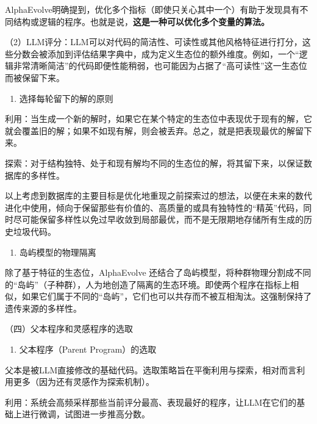 AlphaEvolve明确提到，优化多个指标（即使只关心其中一个）有助于发现具有不同结构或逻辑的程序。也就是说，\textbf{这是一种可以优化多个变量的算法。}

（2）LLM评分：LLM可以对代码的简洁性、可读性或其他风格特征进行打分，这些分数会被添加到评估结果字典中，成为定义生态位的额外维度。例如，一个``逻辑非常清晰简洁''的代码即便性能稍弱，也可能因为占据了``高可读性''这一生态位而被保留下来。

\begin{enumerate}
\def\labelenumi{\arabic{enumi}.}
\setcounter{enumi}{1}
\tightlist
\item
  选择每轮留下的解的原则
\end{enumerate}

利用：当生成一个新的解时，如果它在某个特定的生态位中表现优于现有的解，它就会覆盖旧的解；如果不如现有解，则会被丢弃。总之，就是把表现最优的解留下来。

探索：对于结构独特、处于和现有解均不同的生态位的解，将其留下来，以保证数据库的多样性。

以上考虑到数据库的主要目标是优化地重现之前探索过的想法，以便在未来的数代进化中使用，倾向于保留那些有价值的、高质量的或具有独特性的``精英''代码，同时尽可能保留多样性以免过早收敛到局部最优，而不是无限期地存储所有生成的历史垃圾代码。

\begin{enumerate}
\def\labelenumi{\arabic{enumi}.}
\setcounter{enumi}{2}
\tightlist
\item
  岛屿模型的物理隔离
\end{enumerate}

除了基于特征的生态位，AlphaEvolve 还结合了岛屿模型，将种群物理分割成不同的``岛屿''（子种群），人为地创造了隔离的生态环境。即使两个程序在指标上相似，如果它们属于不同的``岛屿''，它们也可以共存而不被互相淘汰。这强制保持了遗传来源的多样性。

（四）父本程序和灵感程序的选取

\begin{enumerate}
\def\labelenumi{\arabic{enumi}.}
\tightlist
\item
  父本程序（Parent Program）的选取
\end{enumerate}

父本是被LLM直接修改的基础代码。选取策略旨在平衡利用与探索，相对而言利用更多（因为还有灵感作为探索机制）。

利用：系统会高频采样那些当前评分最高、表现最好的程序，让LLM在它们的基础上进行微调，试图进一步推高分数。

